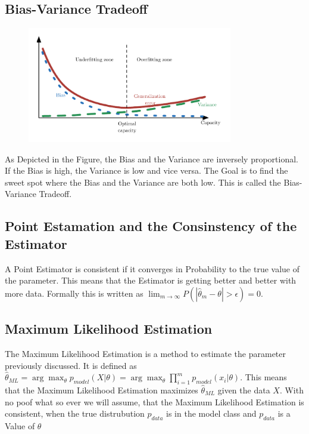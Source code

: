 \documentclass[a4paper]{article}
\begin{document}
\subsection{Bias-Variance Tradeoff}

\begin{figure}[h]
    \centering
    \includegraphics[width=0.8\textwidth]{images/bias_variance_tradeoff.png}
    \caption{}
    \label{fig:}
\end{figure}

As Depicted in the Figure, the Bias and the Variance are inversely proportional. If the Bias is high, the Variance is low and vice versa. The Goal is to find the sweet spot where the Bias and the Variance are both low. This is called the Bias-Variance Tradeoff.

\subsection{Point Estamation and the Consinstency of the Estimator}
A Point Estimator is consistent if it converges in Probability to the true value of the parameter. This means that the Estimator is getting better and better with more data. Formally this is written as $\lim_{m \rightarrow \infty} P(|\hat{\theta}_m - \theta| > \epsilon) = 0$. 

\subsection{Maximum Likelihood Estimation}

The Maximum Likelihood Estimation is a method to estimate the parameter previously discussed. It is defined as $\hat{\theta}_{ML} = \arg \max_{\theta} p_{model}(X|\theta) = \arg \max_{\theta} \prod_{i = 1}^{m} p_{model}(x_{i}|\theta)$. This means that the Maximum Likelihood Estimation maximizes  $ \hat{\theta}_{ML} $ given the data $X$.
With no poof what so ever we will assume, that the Maximum Likelihood Estimation is consistent, when the true distrubution $p_{data} $ is in the model class and $p_{data}$ is a Value of $\theta$ 
\end{document}
